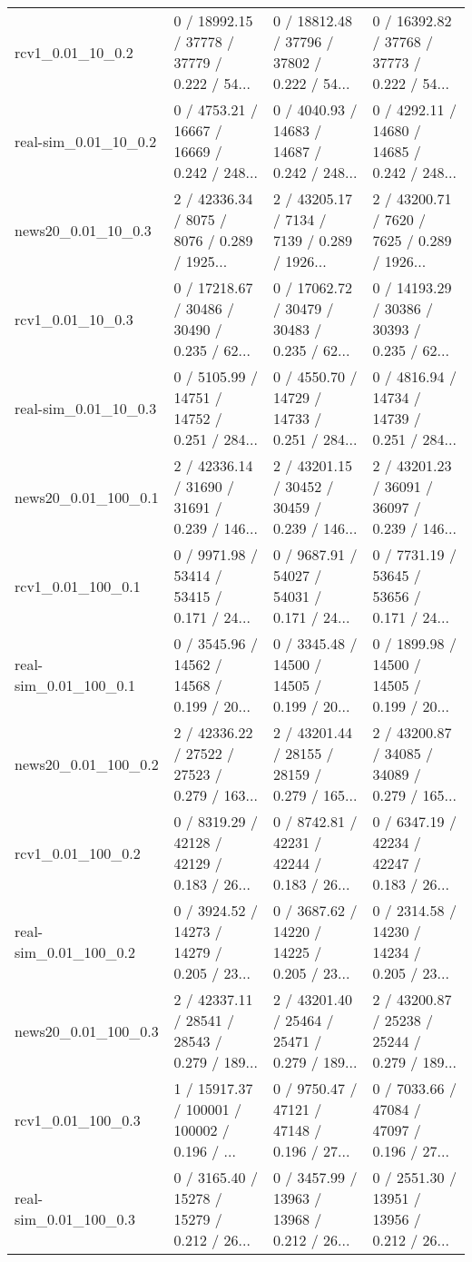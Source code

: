 \begin{tabular}{llll}
          rcv1\_0.01\_10\_0.2 &  0 / 18992.15 /  37778 /   37779 / 0.222 /   54... &  0 / 18812.48 /  37796 /   37802 / 0.222 /   54... &  0 / 16392.82 /  37768 /   37773 / 0.222 /   54... \\
      real-sim\_0.01\_10\_0.2 &  0 / 4753.21 /  16667 /   16669 / 0.242 /   248... &  0 / 4040.93 /  14683 /   14687 / 0.242 /   248... &  0 / 4292.11 /  14680 /   14685 / 0.242 /   248... \\
        news20\_0.01\_10\_0.3 &  2 / 42336.34 /   8075 /    8076 / 0.289 / 1925... &  2 / 43205.17 /   7134 /    7139 / 0.289 / 1926... &  2 / 43200.71 /   7620 /    7625 / 0.289 / 1926... \\
          rcv1\_0.01\_10\_0.3 &  0 / 17218.67 /  30486 /   30490 / 0.235 /   62... &  0 / 17062.72 /  30479 /   30483 / 0.235 /   62... &  0 / 14193.29 /  30386 /   30393 / 0.235 /   62... \\
      real-sim\_0.01\_10\_0.3 &  0 / 5105.99 /  14751 /   14752 / 0.251 /   284... &  0 / 4550.70 /  14729 /   14733 / 0.251 /   284... &  0 / 4816.94 /  14734 /   14739 / 0.251 /   284... \\
       news20\_0.01\_100\_0.1 &  2 / 42336.14 /  31690 /   31691 / 0.239 /  146... &  2 / 43201.15 /  30452 /   30459 / 0.239 /  146... &  2 / 43201.23 /  36091 /   36097 / 0.239 /  146... \\
         rcv1\_0.01\_100\_0.1 &  0 / 9971.98 /  53414 /   53415 / 0.171 /    24... &  0 / 9687.91 /  54027 /   54031 / 0.171 /    24... &  0 / 7731.19 /  53645 /   53656 / 0.171 /    24... \\
     real-sim\_0.01\_100\_0.1 &  0 / 3545.96 /  14562 /   14568 / 0.199 /    20... &  0 / 3345.48 /  14500 /   14505 / 0.199 /    20... &  0 / 1899.98 /  14500 /   14505 / 0.199 /    20... \\
       news20\_0.01\_100\_0.2 &  2 / 42336.22 /  27522 /   27523 / 0.279 /  163... &  2 / 43201.44 /  28155 /   28159 / 0.279 /  165... &  2 / 43200.87 /  34085 /   34089 / 0.279 /  165... \\
         rcv1\_0.01\_100\_0.2 &  0 / 8319.29 /  42128 /   42129 / 0.183 /    26... &  0 / 8742.81 /  42231 /   42244 / 0.183 /    26... &  0 / 6347.19 /  42234 /   42247 / 0.183 /    26... \\
     real-sim\_0.01\_100\_0.2 &  0 / 3924.52 /  14273 /   14279 / 0.205 /    23... &  0 / 3687.62 /  14220 /   14225 / 0.205 /    23... &  0 / 2314.58 /  14230 /   14234 / 0.205 /    23... \\
       news20\_0.01\_100\_0.3 &  2 / 42337.11 /  28541 /   28543 / 0.279 /  189... &  2 / 43201.40 /  25464 /   25471 / 0.279 /  189... &  2 / 43200.87 /  25238 /   25244 / 0.279 /  189... \\
         rcv1\_0.01\_100\_0.3 &  1 / 15917.37 / 100001 /  100002 / 0.196 /     ... &  0 / 9750.47 /  47121 /   47148 / 0.196 /    27... &  0 / 7033.66 /  47084 /   47097 / 0.196 /    27... \\
     real-sim\_0.01\_100\_0.3 &  0 / 3165.40 /  15278 /   15279 / 0.212 /    26... &  0 / 3457.99 /  13963 /   13968 / 0.212 /    26... &  0 / 2551.30 /  13951 /   13956 / 0.212 /    26... \\
\bottomrule
\end{tabular}
